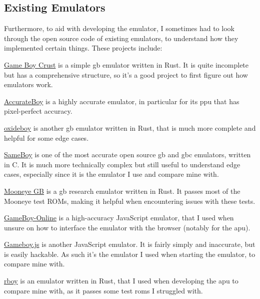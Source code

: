 \documentclass[11pt]{report}
\begin{document}
\subsection{Existing Emulators}

Furthermore, to aid with developing the emulator, I sometimes had to look through the open source code of existing emulators, to understand how they implemented certain things. These projects include:

\begin{compactitem}
    \item \href{https://github.com/mattbruv/Gameboy-Crust}{Game Boy Crust} is a simple \gls{gb} emulator written in Rust. It is quite incomplete but has a comprehensive structure, so it's a good project to first figure out how emulators work.
    \item \href{https://github.com/Atem2069/accurateboy}{AccurateBoy} is a highly accurate emulator, in particular for its \gls{ppu} that has pixel-perfect accuracy.
    \item \href{https://github.com/samcday/oxideboy}{oxideboy} is another \gls{gb} emulator written in Rust, that is much more complete and helpful for some edge cases.
    \item \href{https://github.com/LIJI32/SameBoy}{SameBoy} is one of the most accurate open source \gls{gb} and \gls{gbc} emulators, written in C. It is much more technically complex but still useful to understand edge cases, especially since it is the emulator I use and compare mine with.
    \item \href{https://github.com/Gekkio/mooneye-gb}{Mooneye GB} is a \gls{gb} research emulator written in Rust. It passes most of the Mooneye test ROMs, making it helpful when encountering issues with these tests.
    \item \href{https://github.com/taisel/GameBoy-Online/}{GameBoy-Online} is a high-accuracy JavaScript emulator, that I used when unsure on how to interface the emulator with the browser (notably for the \gls{apu}).
    \item \href{https://github.com/juchi/gameboy.js/}{Gameboy.js} is another JavaScript emulator. It is fairly simply and inaccurate, but is easily hackable. As such it's the emulator I used when starting the emulator, to compare mine with.
    \item \href{https://github.com/mvdnes/rboy}{rboy} is an emulator written in Rust, that I used when developing the \gls{apu} to compare mine with, as it passes some test \glspl{rom} I struggled with.
\end{compactitem}
\end{document}
